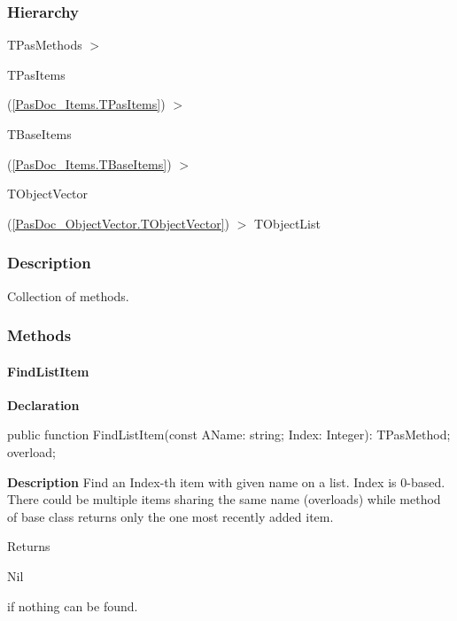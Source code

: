 \documentclass{report}
\newif\ifpdf
\begin{document}
\subsubsection*{\large{\textbf{Hierarchy}}\normalsize\hspace{1ex}\hfill}
TPasMethods {$>$} \begin{ttfamily}TPasItems\end{ttfamily}(\ref{PasDoc_Items.TPasItems}) {$>$} \begin{ttfamily}TBaseItems\end{ttfamily}(\ref{PasDoc_Items.TBaseItems}) {$>$} \begin{ttfamily}TObjectVector\end{ttfamily}(\ref{PasDoc_ObjectVector.TObjectVector}) {$>$} 
TObjectList
\subsubsection*{\large{\textbf{Description}}\normalsize\hspace{1ex}\hfill}
Collection of methods.\subsubsection*{\large{\textbf{Methods}}\normalsize\hspace{1ex}\hfill}
\paragraph*{FindListItem}\hspace*{\fill}

\label{PasDoc_Items.TPasMethods-FindListItem}
\begin{list}{}{
\setlength{\itemindent}{0cm}
\setlength{\listparindent}{0cm}
\setlength{\leftmargin}{\evensidemargin}
\addtolength{\leftmargin}{\tmplength}
\settowidth{\labelsep}{X}
\addtolength{\leftmargin}{\labelsep}
\setlength{\labelwidth}{\tmplength}
}
\item[\textbf{Declaration}\hfill]
\ifpdf
\begin{flushleft}
\fi
\begin{ttfamily}
public function FindListItem(const AName: string; Index: Integer): TPasMethod; overload;\end{ttfamily}

\ifpdf
\end{flushleft}
\fi

\par
\item[\textbf{Description}]
Find an Index{-}th item with given name on a list. Index is 0{-}based. There could be multiple items sharing the same name (overloads) while method of base class returns only the one most recently added item.

Returns \begin{ttfamily}Nil\end{ttfamily} if nothing can be found.

\end{list}
\ifpdf
\end{document}
